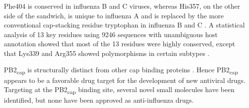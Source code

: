 Phe404 is conserved in influenza B and C viruses, whereas His357, on the other side of the sandwich, is unique to influenza A and is replaced by the more conventional cap-stacking residue tryptophan in influenza B and C \citep{1192}. A statistical analysis of 13 key residues using 9246 sequences with unambiguous host annotation showed that most of the 13 residues were highly conserved, except that Lys339 and Arg355 showed polymorphisms in certain subtypes \citep{1554}.

PB2\textsubscript{cap} is structurally distinct from other cap binding proteins \citep{1192}. Hence PB2\textsubscript{cap} appears to be a favorable drug target for the development of new antiviral drugs. Targeting at the PB2\textsubscript{cap} binding site, several novel small molecules \citep{1236,1557,1558} have been identified, but none have been approved as anti-influenza drugs.


